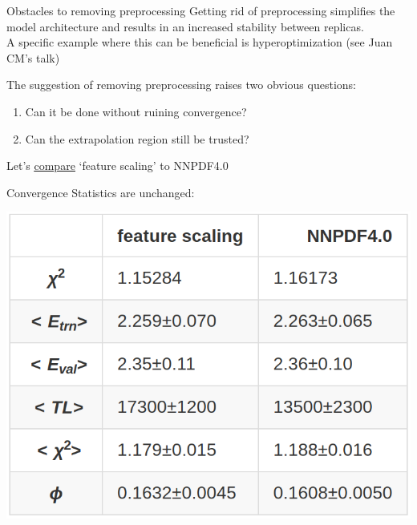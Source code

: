 \documentclass[aspectratio=169,11pt]{beamer}
\newcommand{\nn}{\vspace*{1em}}
\begin{document}
\begin{frame}[t]{Obstacles to removing preprocessing}
  Getting rid of preprocessing simplifies the model architecture and results in an increased stability between replicas. \\ \nn
  A specific example where this can be beneficial is hyperoptimization (see Juan CM's talk) \\ \vspace*{1.2cm}

  The suggestion of removing preprocessing raises two obvious questions:
  \begin{enumerate}
    \item Can it be done without ruining convergence?
    \item Can the extrapolation region still be trusted?
  \end{enumerate}
  \nn
  \begin{center}
    Let's {\color{blue} \underline{\href{https://vp.nnpdf.science/TVyAUeiNTk26IMYAfRNqLw==}{compare}}} `feature scaling' to NNPDF4.0
  \end{center}
\end{frame}


\begin{frame}[t]{Convergence}
  Statistics are unchanged:\\
  \begin{center}
    \includegraphics[height=0.5\textheight]{figures/summary_feature_vs_nnpdf40.png}
  \end{center}
\end{frame}
\end{document}
